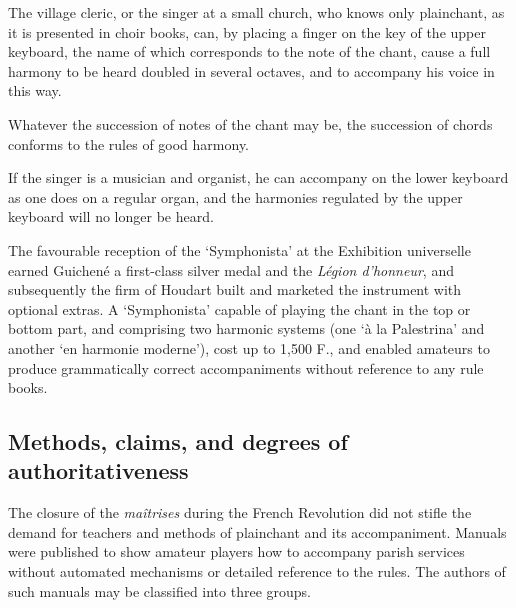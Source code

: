       {\cites[6--7]{NisardNoticevietravaux1863}[See also][207]{LessmannRezeptiongregorianischenChorals2016}}
    {The village cleric, or the singer at a small church, who knows only plainchant, as it is presented in choir books, can, by placing a finger on the key of the upper keyboard, the name of which corresponds to the note of the chant, cause a full harmony to be heard doubled in several octaves, and to accompany his voice in this way.

    \parindent=10pt
    Whatever the succession of notes of the chant may be, the succession of chords conforms to the rules of good harmony.

    If the singer is a musician and \linebreak{}organist, he can accompany on the lower keyboard as one does on a regular organ, and the harmonies regulated by the upper keyboard will no longer be heard.}
\noindent
The favourable reception of the `Symphonista' at the Exhibition universelle earned Guichené a first-class silver medal and the \textit{Légion d'honneur}, and subsequently the firm of Houdart built and marketed the instrument with optional extras.
A `Symphonista' capable of playing the chant in the top or bottom part, and comprising two harmonic systems (one `à la Palestrina' and another `en harmonie moderne'), cost up to 1,500 F., and enabled amateurs to produce grammatically correct accompaniments without reference to any rule books.

\subsection{Methods, claims, and degrees of authoritativeness}
The closure of the \emph{maîtrises} during the French Revolution did not stifle the demand for teachers and methods of plainchant and its accompaniment.
Manuals were published to show amateur players how to accompany parish services without automated mechanisms or detailed reference to the rules.
The authors of such manuals may be classified into three groups.
\noclub[2]

